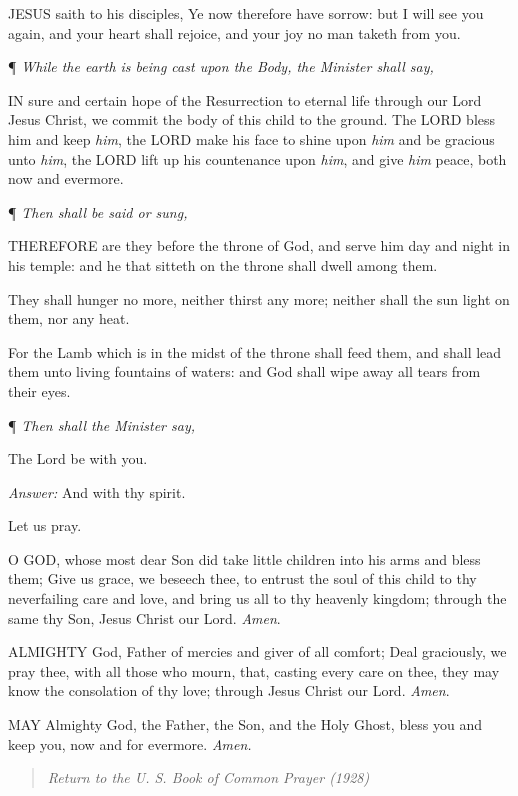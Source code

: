 JESUS
saith to his disciples, Ye now therefore have sorrow: but I will see you
again, and your heart shall rejoice, and your joy no man taketh from you.

¶
\emph{While the earth is being cast upon the Body, the Minister shall say,}

IN
sure and certain hope of the Resurrection to eternal life through our
Lord Jesus Christ, we commit the body of this child to the ground. The
LORD bless him and keep \emph{him}, the LORD
make his face to shine upon \emph{him} and be gracious unto \emph{him},
the LORD lift up his countenance upon \emph{him},
and give \emph{him} peace, both now and evermore.

¶
\emph{Then shall be said or sung,}

THEREFORE
are they before the throne of God, and serve him day and night in his
temple: and he that sitteth on the throne shall dwell among them.

They shall hunger no more, neither thirst any more;
neither shall the sun light on them, nor any heat.

For the Lamb which is in the midst of the throne shall
feed them, and shall lead them unto living fountains of waters: and God
shall wipe away all tears from their eyes.

¶
\emph{Then shall the Minister say,}

The
Lord be with you.

\emph{Answer:} And with thy
spirit.

Let us
pray.

O
GOD, whose most dear Son did take little children into his arms and bless
them; Give us grace, we beseech thee, to entrust the soul of this child
to thy neverfailing care and love, and bring us all to thy heavenly kingdom;
through the same thy Son, Jesus Christ our Lord. \emph{Amen}.

ALMIGHTY
God, Father of mercies and giver of all comfort; Deal graciously, we pray
thee, with all those who mourn, that, casting every care on thee, they
may know the consolation of thy love; through Jesus Christ our Lord. \emph{Amen}.

MAY
Almighty God, the Father, the Son, and the Holy Ghost, bless you and keep
you, now and for evermore. \emph{Amen.}

\begin{quote}

\emph{Return to the U.
S. Book of Common Prayer (1928)}

\end{quote}

